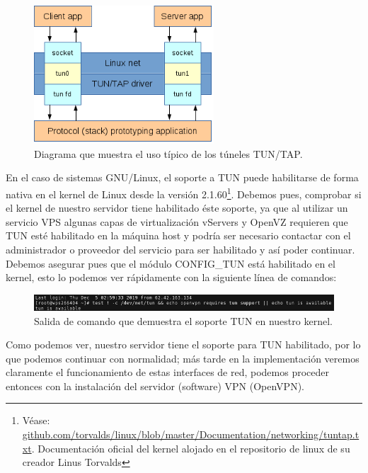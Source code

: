 \documentclass[a4paper, 11pt, titlepage]{article}
\begin{document}
        \begin{figure}[htp]
            \centering
            \includegraphics[width=0.6\textwidth]{resources/tuntap02.png}
            \caption{Diagrama que muestra el uso típico de los túneles TUN/TAP.}
            \label{tuntap02}
        \end{figure}
    
        En el caso de sistemas GNU/Linux, el soporte a TUN puede habilitarse de forma nativa en el kernel de Linux desde la versión 2.1.60\footnote{Véase:
        \href{https://github.com/torvalds/linux/blob/master/Documentation/networking/tuntap.txt}{github.com/torvalds/linux/blob/master/Documentation/networking/tuntap.txt}.
        Documentación oficial del kernel alojado en el repositorio de linux de su creador Linus Torvalds}. Debemos pues, comprobar si el kernel de nuestro
        servidor tiene habilitado éste soporte, ya que al utilizar un servicio VPS algunas capas de virtualización vServers y OpenVZ requieren que TUN
        esté habilitado en la máquina host y podría ser necesario contactar con el administrador o proveedor del servicio para ser habilitado y así poder 
        continuar. Debemos asegurar pues que el módulo CONFIG\_TUN está habilitado en el kernel, esto lo podemos ver rápidamente con la siguiente línea de 
        comandos:
        
        \begin{figure}[htp]
            \centering
            \includegraphics[width=1\textwidth]{resources/openvpn01.png}
            \caption{Salida de comando que demuestra el soporte TUN en nuestro kernel.}
            \label{tuntap02}
        \end{figure}
        
        Como podemos ver, nuestro servidor tiene el soporte para TUN habilitado, por lo que podemos continuar con normalidad; más tarde en la implementación
        veremos claramente el funcionamiento de estas interfaces de red, podemos proceder entonces con la instalación del servidor (software) VPN (OpenVPN).
    
\end{document}
